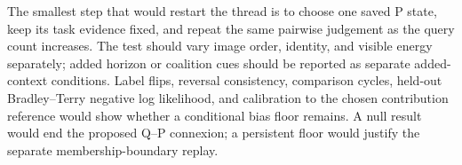 \documentclass{article}
\begin{document}
The smallest step that would restart the thread is to choose one saved P state, keep its task evidence fixed, and repeat the same pairwise judgement as the query count increases.  The test should vary image order, identity, and visible energy separately; added horizon or coalition cues should be reported as separate added-context conditions.  Label flips, reversal consistency, comparison cycles, held-out Bradley--Terry negative log likelihood, and calibration to the chosen contribution reference would show whether a conditional bias floor remains.  A null result would end the proposed Q--P connexion; a persistent floor would justify the separate membership-boundary replay.



\end{document}
